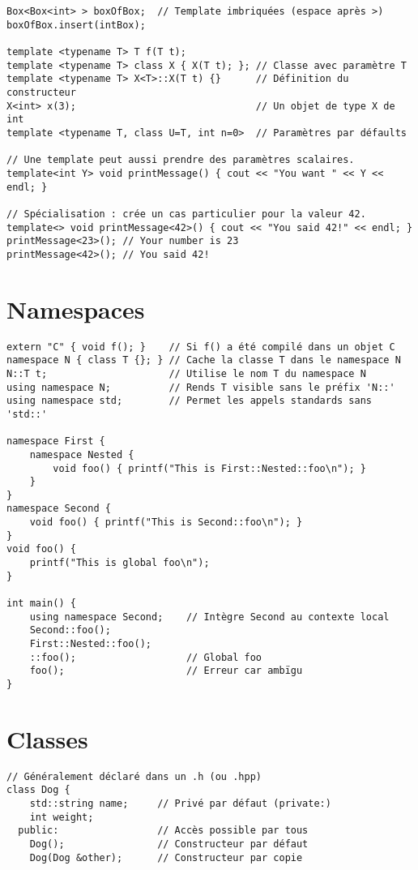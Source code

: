 \documentclass{article}
\begin{document}
\begin{multicols*}{3}
\begin{lstlisting}
Box<Box<int> > boxOfBox;  // Template imbriquées (espace après >)
boxOfBox.insert(intBox);

template <typename T> T f(T t);
template <typename T> class X { X(T t); }; // Classe avec paramètre T
template <typename T> X<T>::X(T t) {}      // Définition du constructeur
X<int> x(3);                               // Un objet de type X de int
template <typename T, class U=T, int n=0>  // Paramètres par défaults

// Une template peut aussi prendre des paramètres scalaires.
template<int Y> void printMessage() { cout << "You want " << Y << endl; }

// Spécialisation : crée un cas particulier pour la valeur 42.
template<> void printMessage<42>() { cout << "You said 42!" << endl; }
printMessage<23>(); // Your number is 23
printMessage<42>(); // You said 42!

\end{lstlisting}

\section*{Namespaces}

\begin{lstlisting}
extern "C" { void f(); }    // Si f() a été compilé dans un objet C
namespace N { class T {}; } // Cache la classe T dans le namespace N
N::T t;                     // Utilise le nom T du namespace N
using namespace N;          // Rends T visible sans le préfix 'N::'
using namespace std;        // Permet les appels standards sans 'std::'

namespace First {
    namespace Nested {
        void foo() { printf("This is First::Nested::foo\n"); }
    }
}
namespace Second {
    void foo() { printf("This is Second::foo\n"); }
}
void foo() {
    printf("This is global foo\n");
}

int main() {
    using namespace Second;    // Intègre Second au contexte local
    Second::foo();
    First::Nested::foo();
    ::foo();                   // Global foo
    foo();                     // Erreur car ambïgu
}
\end{lstlisting}

\section*{Classes}

\begin{lstlisting}
// Généralement déclaré dans un .h (ou .hpp)
class Dog {
    std::string name;     // Privé par défaut (private:)
    int weight;
  public:                 // Accès possible par tous
    Dog();                // Constructeur par défaut
    Dog(Dog &other);      // Constructeur par copie


\end{lstlisting}
\end{multicols*}
\end{document}
